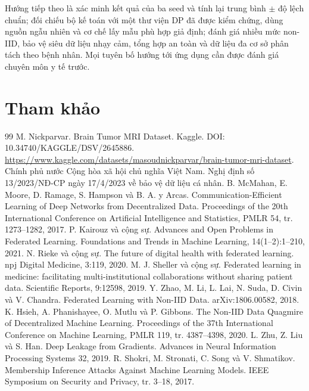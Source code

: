 \documentclass[12pt,a4paper]{report}
\begin{document}
Hướng tiếp theo là xác minh kết quả của ba seed và tính lại trung bình $\pm$ độ lệch chuẩn; đối chiếu bộ kế toán với một thư viện DP đã được kiểm chứng, dùng nguồn ngẫu nhiên và cơ chế lấy mẫu phù hợp giả định; đánh giá nhiều mức non-IID, bảo vệ siêu dữ liệu nhạy cảm, tổng hợp an toàn và dữ liệu đa cơ sở phân tách theo bệnh nhân. Mọi tuyên bố hướng tới ứng dụng cần được đánh giá chuyên môn y tế trước.

\chapter{Tham khảo}
\begin{thebibliography}{99}
 M. Nickparvar. \newblock Brain Tumor MRI Dataset. Kaggle. \newblock DOI: 10.34740/KAGGLE/DSV/2645886. \newblock \url{https://www.kaggle.com/datasets/masoudnickparvar/brain-tumor-mri-dataset}.
 Chính phủ nước Cộng hòa xã hội chủ nghĩa Việt Nam. \newblock Nghị định số 13/2023/NĐ-CP ngày 17/4/2023 về bảo vệ dữ liệu cá nhân.
 B. McMahan, E. Moore, D. Ramage, S. Hampson và B. A. y Arcas. \newblock Communication-Efficient Learning of Deep Networks from Decentralized Data. \newblock Proceedings of the 20th International Conference on Artificial Intelligence and Statistics, PMLR 54, tr. 1273--1282, 2017.
 P. Kairouz và cộng sự. \newblock Advances and Open Problems in Federated Learning. \newblock Foundations and Trends in Machine Learning, 14(1--2):1--210, 2021.
 N. Rieke và cộng sự. \newblock The future of digital health with federated learning. \newblock npj Digital Medicine, 3:119, 2020.
 M. J. Sheller và cộng sự. \newblock Federated learning in medicine: facilitating multi-institutional collaborations without sharing patient data. \newblock Scientific Reports, 9:12598, 2019.
 Y. Zhao, M. Li, L. Lai, N. Suda, D. Civin và V. Chandra. \newblock Federated Learning with Non-IID Data. \newblock arXiv:1806.00582, 2018.
 K. Hsieh, A. Phanishayee, O. Mutlu và P. Gibbons. \newblock The Non-IID Data Quagmire of Decentralized Machine Learning. \newblock Proceedings of the 37th International Conference on Machine Learning, PMLR 119, tr. 4387--4398, 2020.
 L. Zhu, Z. Liu và S. Han. \newblock Deep Leakage from Gradients. \newblock Advances in Neural Information Processing Systems 32, 2019.
 R. Shokri, M. Stronati, C. Song và V. Shmatikov. \newblock Membership Inference Attacks Against Machine Learning Models. \newblock IEEE Symposium on Security and Privacy, tr. 3--18, 2017.

\end{thebibliography}
\end{document}

